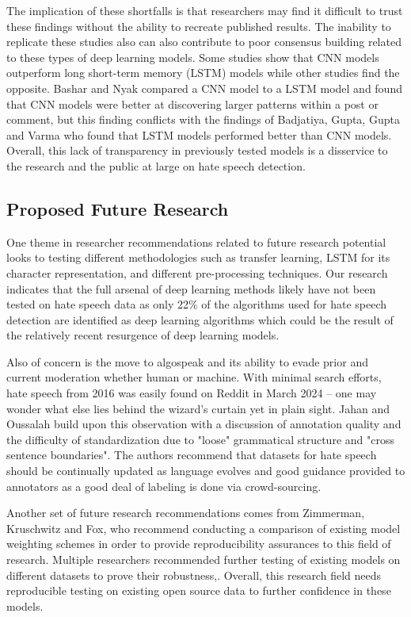 \documentclass[conference]{IEEEtran}
\begin{document}
The implication of these shortfalls is that researchers may find it difficult to trust these findings without the ability to recreate published results. The inability to replicate these studies also can also contribute to poor consensus building related to these types of deep learning models. Some studies show that CNN models outperform long short-term memory (LSTM) models while other studies find the opposite\cite{b10}. Bashar and Nyak\cite{b20} compared a CNN model to a LSTM model and found that CNN models were better at discovering larger patterns within a post or comment, but this finding conflicts with the findings of Badjatiya, Gupta, Gupta and Varma\cite{b21} who found that LSTM models performed better than CNN models. Overall, this lack of transparency in previously tested models is a disservice to the research and the public at large on hate speech detection.

\subsection{Proposed Future Research}
One theme in researcher recommendations related to future research potential looks to testing different methodologies such as transfer learning\cite{b18}, LSTM for its character representation\cite{b22}, and different pre-processing techniques\cite{b12}. Our research indicates that the full arsenal of deep learning methods likely have not been tested on hate speech data as only 22\% of the algorithms used for hate speech detection are identified as deep learning algorithms\cite{b6} which could be the result of the relatively recent resurgence of deep learning models. 

Also of concern is the move to algospeak and its ability to evade prior and current moderation whether human or machine. With minimal search efforts, hate speech from 2016 was easily found on Reddit in March 2024 -- one may wonder what else lies behind the wizard's curtain yet in plain sight.  Jahan and Oussalah build upon this observation with a discussion of annotation quality and the difficulty of standardization due to "loose" grammatical structure and "cross sentence boundaries"\cite{b10}. The authors recommend that datasets for hate speech should be continually updated as language evolves and good guidance provided to annotators as a good deal of labeling is done via crowd-sourcing. 

Another set of future research recommendations comes from Zimmerman, Kruschwitz and Fox\cite{b19}, who recommend conducting a comparison of existing model weighting schemes in order to provide reproducibility assurances to this field of research. Multiple researchers recommended further testing of existing models on different datasets to prove their robustness\cite{b11},\cite{b19}. Overall, this research field needs reproducible testing on existing open source data to further confidence in these models. 
\end{document}
